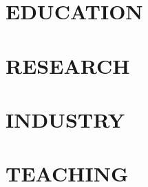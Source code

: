 \documentclass[margin, 11pt]{res} %
\begin{document}




\begin{resume}

\section{EDUCATION}


\section{RESEARCH}


\section{INDUSTRY}


\section{TEACHING}



\end{resume}
\end{document}
